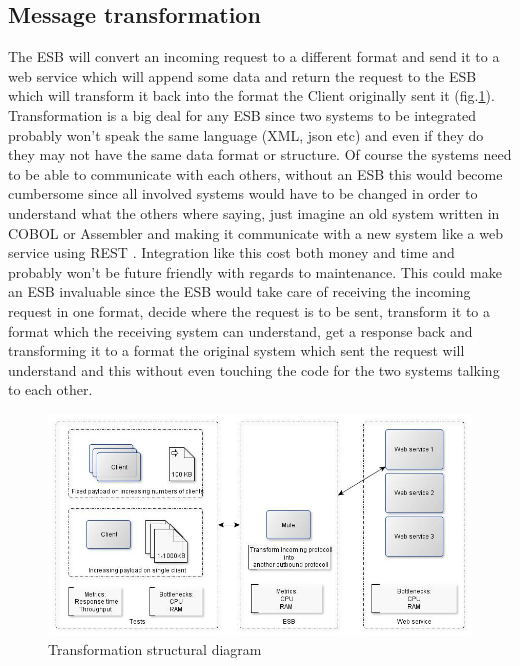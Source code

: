\subsection{Message transformation}
The ESB will convert an incoming request to a different format and send it to a web service which will append some data and return the request to the ESB which will transform it back into the format the Client originally sent it (fig.\ref{fig:transform-diagram}).
Transformation is a big deal for any ESB since two systems to be integrated probably won't speak the same language (XML, json etc) and even if they do they may not have the same data format or structure. Of course the systems need to be able to communicate with each others, without an ESB this would become cumbersome since all involved systems would have to be changed in order to understand what the others where saying, just imagine an old system written in COBOL or Assembler and making it communicate with a new system like a web service using REST \cite{whatisrest}. Integration like this cost both money and time and probably won't be future friendly with regards to maintenance.
This could make an ESB invaluable since the ESB would take care of receiving the incoming request in one format, decide where the request is to be sent, transform it to a format which the receiving system can understand, get a response back and transforming it to a format the original system which sent the request will understand and this without even touching the code for the two systems talking to each other.

\begin{figure}[H]
	\centerline{\includegraphics[scale=0.43]{img/transformation}}
	\caption{Transformation structural diagram}
	\label{fig:transform-diagram}
\end{figure}

